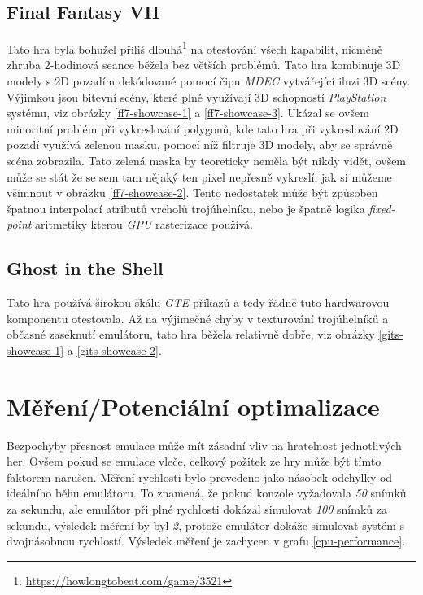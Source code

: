 \subsection{Final Fantasy VII}

Tato hra byla bohužel příliš dlouhá\footnote{\url{https://howlongtobeat.com/game/3521}} na otestování všech kapabilit,
nicméně zhruba 2-hodinová seance běžela bez větších problémů. Tato hra kombinuje 3D modely s 2D pozadím dekódované pomocí čipu \textit{MDEC} vytvářející
iluzi 3D scény. Výjimkou jsou bitevní scény, které plně využívají 3D schopností \textit{PlayStation} systému, viz obrázky \ref{ff7-showcase-1} a \ref{ff7-showcase-3}. Ukázal se ovšem minoritní problém
při vykreslování polygonů, kde tato hra při vykreslování 2D pozadí využívá zelenou masku, pomocí níž filtruje 3D modely, aby se správně scéna zobrazila.
Tato zelená maska by teoreticky neměla být nikdy vidět, ovšem může se stát že se sem tam nějaký ten pixel nepřesně vykreslí, jak si můžeme všimnout v obrázku \ref{ff7-showcase-2}.
Tento nedostatek může být způsoben špatnou interpolací atributů vrcholů trojúhelníku, nebo je špatně logika \textit{fixed-point} aritmetiky
kterou \textit{GPU} rasterizace používá.

\subsection{Ghost in the Shell}

Tato hra používá širokou škálu \textit{GTE} příkazů a tedy řádně tuto hardwarovou komponentu otestovala.
Až na výjimečné chyby v texturování trojúhelníků a občasné zaseknutí emulátoru, tato hra běžela relativně dobře, viz obrázky \ref{gits-showcase-1} a \ref{gits-showcase-2}.

\section{Měření/Potenciální optimalizace}

Bezpochyby přesnost emulace může mít zásadní vliv na hratelnost jednotlivých her. Ovšem pokud se emulace vleče,
celkový požitek ze hry může být tímto faktorem narušen. Měření rychlosti bylo provedeno jako násobek odchylky od
ideálního běhu emulátoru. To znamená, že pokud konzole vyžadovala \textit{50} snímků za sekundu, ale emulátor při plné
rychlosti dokázal simulovat \textit{100} snímků za sekundu, výsledek měření by byl \textit{2}, protože emulátor
dokáže simulovat systém s dvojnásobnou rychlostí. Výsledek měření je zachycen v grafu \ref{cpu-performance}.


